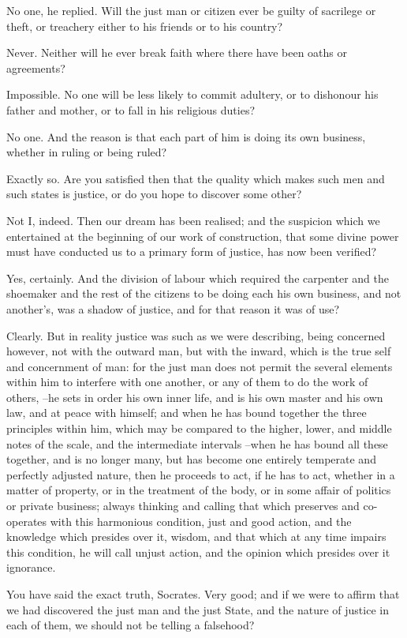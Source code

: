 No one, he replied.
Will the just man or citizen ever be guilty of sacrilege or theft, or treachery either to his friends or to his country?

Never.
Neither will he ever break faith where there have been oaths or agreements?

Impossible.
No one will be less likely to commit adultery, or to dishonour his father and mother, or to fall in his religious duties?

No one.
And the reason is that each part of him is doing its own business, whether in ruling or being ruled?

Exactly so.
Are you satisfied then that the quality which makes such men and such states is justice, or do you hope to discover some other?

Not I, indeed.
Then our dream has been realised; and the suspicion which we entertained at the beginning of our work of construction, that some divine power must have conducted us to a primary form of justice, has now been verified?

Yes, certainly.
And the division of labour which required the carpenter and the shoemaker and the rest of the citizens to be doing each his own business, and not another's, was a shadow of justice, and for that reason it was of use?

Clearly.
But in reality justice was such as we were describing, being concerned however, not with the outward man, but with the inward, which is the true self and concernment of man: for the just man does not permit the several elements within him to interfere with one another, or any of them to do the work of others, --he sets in order his own inner life, and is his own master and his own law, and at peace with himself; and when he has bound together the three principles within him, which may be compared to the higher, lower, and middle notes of the scale, and the intermediate intervals --when he has bound all these together, and is no longer many, but has become one entirely temperate and perfectly adjusted nature, then he proceeds to act, if he has to act, whether in a matter of property, or in the treatment of the body, or in some affair of politics or private business; always thinking and calling that which preserves and co-operates with this harmonious condition, just and good action, and the knowledge which presides over it, wisdom, and that which at any time impairs this condition, he will call unjust action, and the opinion which presides over it ignorance.

You have said the exact truth, Socrates.
Very good; and if we were to affirm that we had discovered the just man and the just State, and the nature of justice in each of them, we should not be telling a falsehood?

